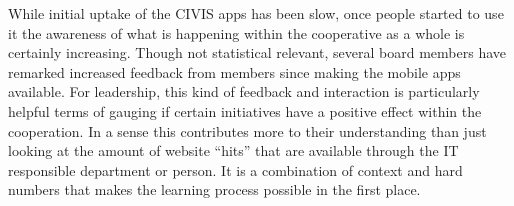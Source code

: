 While initial uptake of the CIVIS apps has been slow, once people started to use it the awareness of what is happening within the cooperative as a whole is certainly increasing. Though not statistical relevant, several board members have remarked increased feedback from members since making the mobile apps available. For leadership, this kind of feedback and interaction is particularly helpful terms of gauging if certain initiatives have a positive effect within the cooperation. In a sense this contributes more to their understanding than just looking at the amount of website ``hits'' that are available through the IT responsible department or person. It is a combination of context and hard numbers that makes the learning process possible in the first place. 
